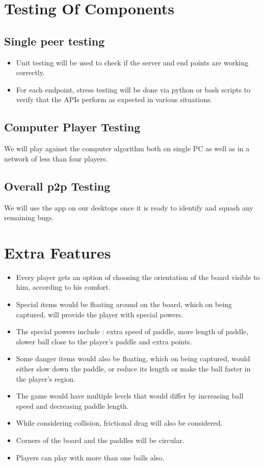 \documentclass{article}
\begin{document}
	\section{Testing Of Components}
			\subsection{Single peer testing}
				\begin{itemize}
					\item Unit testing will be used to check if the server and end points are working correctly.
					\item For each endpoint, stress testing will be done via python or bash scripts to verify that the APIs perform as expected in various situations.
				\end{itemize}

			\subsection{Computer Player Testing}
			We will play against the computer algorithm both on single PC as well as in a network of less than four players.
			\subsection{Overall p2p Testing}
				We will use the app on our desktops once it is ready to identify and squash any remaining bugs.
	\section{Extra Features}
	\begin{itemize}
	\item Every player gets an option of choosing the orientation of the board visible to him, according to his comfort.
	\item Special items would be floating around on the board, which on being captured, will provide the player with special powers.
	\item The special powers include : extra speed of paddle, more length of paddle, slower ball close to the player's paddle and extra points.
	\item Some danger items would also be floating, which on being captured, would either slow down the paddle, or reduce its length or make the ball faster in the player's region.
	\item The game would have multiple levels that would differ by increasing ball speed and decreasing paddle length.
	\item While considering collision, frictional drag will also be considered.
	\item Corners of the board and the paddles will be circular.
	\item Players can play with more than one balls also.
	\end{itemize}
\end{document}
